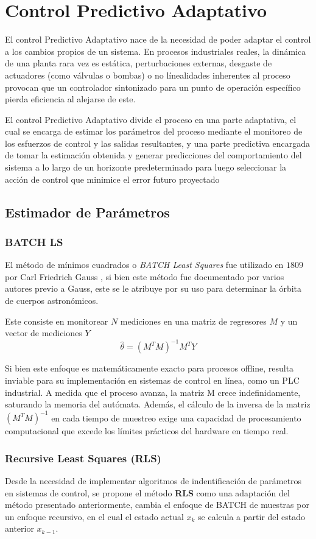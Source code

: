 \clearpage
\section{Control Predictivo Adaptativo}
El control Predictivo Adaptativo nace de la necesidad de poder adaptar el control a los cambios propios de un sistema. En procesos industriales reales, la dinámica de una planta rara vez es estática, perturbaciones externas, desgaste de actuadores (como válvulas o bombas) o no línealidades inherentes al proceso provocan que un controlador sintonizado para un punto de operación específico pierda eficiencia al alejarse de este.

El control Predictivo Adaptativo divide el proceso en una parte adaptativa, el cual se encarga de estimar los parámetros del proceso mediante el monitoreo de los esfuerzos de control y las salidas resultantes, y una parte predictiva encargada de tomar la estimación obtenida y generar predicciones del comportamiento del sistema a lo largo de un horizonte predeterminado para luego seleccionar la acción de control que minimice el error futuro proyectado
\subsection{Estimador de Parámetros}
\subsubsection{BATCH LS}
El método de mínimos cuadrados o \textit{BATCH Least Squares} fue utilizado en $1809$ por Carl Friedrich Gauss \cite{stigler1981gauss}, si bien este método fue documentado por varios autores previo a Gauss, este se le atribuye por su uso para determinar la órbita de cuerpos astronómicos.

Este consiste en monitorear $N$ mediciones en una matriz de regresores $M$ y un vector de mediciones $Y$
\[
  \hat{\theta}=(M^TM)^{-1}M^TY
\]

Si bien este enfoque es matemáticamente exacto para procesos offline, resulta inviable para su implementación en sistemas de control en línea, como un PLC industrial. A medida que el proceso avanza, la matriz M crece indefinidamente, saturando la memoria del autómata. Además, el cálculo de la inversa de la matriz $(M^TM)^{-1}$ en cada tiempo de muestreo exige una capacidad de procesamiento computacional que excede los límites prácticos del hardware en tiempo real.

\clearpage
\subsubsection{Recursive Least Squares (RLS)}
Desde la necesidad de implementar algoritmos de indentificación de parámetros en sistemas de control, se propone el método \textbf{RLS} como una adaptación del método presentado anteriormente, cambia el enfoque de BATCH de muestras por un enfoque recursivo, en el cual el estado actual $x_{k}$ se calcula a partir del estado anterior $x_{k-1}$.

